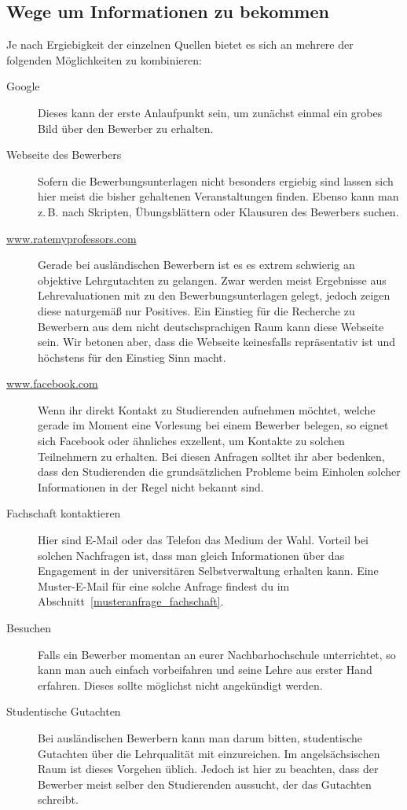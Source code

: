 \documentclass[10pt,twoside,a5paper,openright]{book}
\begin{document}
\subsection{Wege um Informationen zu bekommen}
Je nach Ergiebigkeit der einzelnen Quellen bietet es sich an mehrere der folgenden Möglichkeiten zu kombinieren:
\begin{description}
	\item [Google]
		  Dieses kann der erste Anlaufpunkt sein, um zunächst einmal ein grobes Bild über den Bewerber zu erhalten.
	\item [Webseite des Bewerbers]
		  Sofern die Bewerbungsunterlagen nicht besonders ergiebig sind lassen sich hier meist die bisher gehaltenen Veranstaltungen finden. Ebenso kann man z.\,B. nach Skripten, Übungsblättern oder Klausuren des Bewerbers suchen.
	\item [\url{www.ratemyprofessors.com}]
		  Gerade bei ausländischen Bewerbern ist es es extrem schwierig an objektive Lehrgutachten zu gelangen. Zwar werden meist Ergebnisse aus Lehrevaluationen mit zu den Bewerbungsunterlagen gelegt, jedoch zeigen diese naturgemäß nur Positives. Ein Einstieg für die Recherche zu Bewerbern aus dem nicht deutschsprachigen Raum kann diese Webseite sein. Wir betonen aber, dass die Webseite keinesfalls repräsentativ ist und höchstens für den Einstieg Sinn macht.
	\item [\url{www.facebook.com}]
		  Wenn ihr direkt Kontakt zu Studierenden aufnehmen möchtet, welche gerade im Moment eine Vorlesung bei einem Bewerber belegen, so eignet sich Facebook oder ähnliches exzellent, um Kontakte zu solchen Teilnehmern zu erhalten. Bei diesen Anfragen solltet ihr aber bedenken, dass den Studierenden die grundsätzlichen Probleme beim Einholen solcher Informationen in der Regel nicht bekannt sind.
	\item [Fachschaft kontaktieren]
		  Hier sind E-Mail oder das Telefon das Medium der Wahl. Vorteil bei solchen Nachfragen ist, dass man gleich Informationen über das Engagement in der universitären Selbstverwaltung erhalten kann. Eine Muster-E-Mail für eine solche Anfrage findest du im Abschnitt~\ref{musteranfrage_fachschaft}.
	\item [Besuchen]
		  Falls ein Bewerber momentan an eurer Nachbarhochschule unterrichtet, so kann man auch einfach vorbeifahren und seine Lehre aus erster Hand erfahren. Dieses sollte möglichst nicht angekündigt werden.
	\item [Studentische Gutachten]
		  Bei ausländischen Bewerbern kann man darum bitten, studentische Gutachten über die Lehrqualität mit einzureichen. Im angelsächsischen Raum ist dieses Vorgehen üblich. Jedoch ist hier zu beachten, dass der Bewerber meist selber den Studierenden aussucht, der das Gutachten schreibt.
\end{description}
\end{document}
